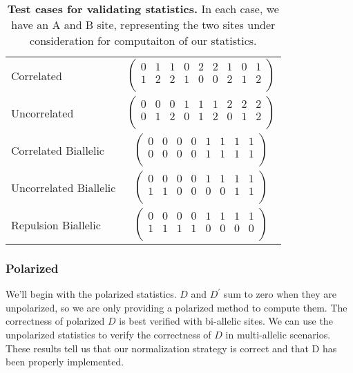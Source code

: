 \documentclass[12pt]{article}
\begin{document}
\begin{table}[H]
\begin{tabular}{lc}
    \hline
    Correlated & $\left(\begin{array}{ccccccccc}
                          0 & 1 & 1 & 0 & 2 & 2 & 1 & 0 & 1 \\
                          1 & 2 & 2 & 1 & 0 & 0 & 2 & 1 & 2 \\
                        \end{array}\right)$ \\
    Uncorrelated & $\left(\begin{array}{ccccccccc}
                            0 & 0 & 0 & 1 & 1 & 1 & 2 & 2 & 2 \\
                            0 & 1 & 2 & 0 & 1 & 2 & 0 & 1 & 2 \\
                          \end{array}\right)$ \\
    Correlated Biallelic & $\left(\begin{array}{cccccccc}
                                    0 & 0 & 0 & 0 & 1 & 1 & 1 & 1 \\
                                    0 & 0 & 0 & 0 & 1 & 1 & 1 & 1 \\
                                  \end{array}\right)$ \\
    Uncorrelated Biallelic & $\left(\begin{array}{cccccccc}
                                      0 & 0 & 0 & 0 & 1 & 1 & 1 & 1 \\
                                      1 & 1 & 0 & 0 & 0 & 0 & 1 & 1 \\
                                    \end{array}\right)$ \\
    Repulsion Biallelic & $\left(\begin{array}{cccccccc}
                                   0 & 0 & 0 & 0 & 1 & 1 & 1 & 1 \\
                                   1 & 1 & 1 & 1 & 0 & 0 & 0 & 0 \\
                                 \end{array}\right)$ \\
  \end{tabular}
  \caption{
    \textbf{Test cases for validating statistics.}
    In each case, we have an A and B site, representing the two sites under
    consideration for computaiton of our statistics.
  }
  \label{table:test_cases}
\end{table}

\subsubsection{Polarized}
We'll begin with the polarized statistics. $D$ and $D^{\prime}$ sum to zero when
they are unpolarized, so we are only providing a polarized method to compute
them. The correctness of polarized $D$ is best verified with bi-allelic
sites. We can use the unpolarized statistics to verify the correctness of $D$ in
multi-allelic scenarios. These results tell us that our normalization strategy
is correct and that D has been properly implemented.
\end{document}
